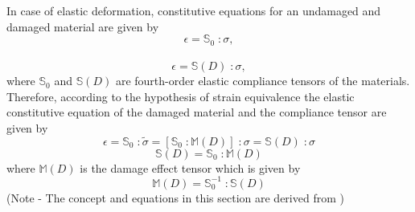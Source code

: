 \documentclass[12pt,a4paper,twoside,openright]{report}
\begin{document}
In case of elastic deformation, constitutive equations for an undamaged and damaged material are given by
\begin{equation}
\epsilon = \mathbb{S}_{0}\; : \sigma,
\end{equation}\\
\begin{equation}
\epsilon = \mathbb{S}(D)\; : \sigma,
\end{equation}
where $\mathbb{S}_{0}$ and $\mathbb{S}(D)$  are fourth-order elastic compliance tensors of the materials. Therefore, according to the hypothesis of strain equivalence the elastic constitutive equation of the damaged material and the compliance tensor are given by 
\begin{equation}
\epsilon = \mathbb{S}_{0}\; : \tilde{\sigma}  =  [\mathbb{S}_{0}\;: \mathbb{M} (D)]\;: \sigma = \mathbb{S}(D)\; : \sigma
\end{equation}
\begin{equation}
\mathbb{S}(D) = \mathbb{S}_{0}\; : \mathbb{M} (D)
 \label{eqn:S_HSeq}
\end{equation}
where $\mathbb{M} (D)$ is the damage effect tensor which is given by 
\begin{equation}
\mathbb{M} (D)  = \mathbb{S}_{0}^{-1} \; : \mathbb{S}(D) 
\end{equation}
(Note - The concept and equations in this section are derived from \citep{murakami2012continuum})
\end{document}
